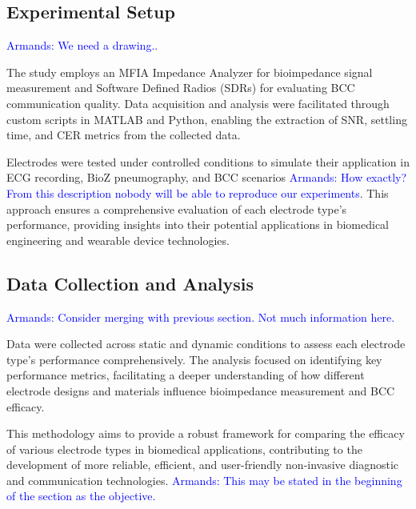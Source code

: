 \documentclass[conference]{IEEEtran}
\newcommand{\notea}[1]{\textcolor{blue}{Armands: #1}}
\begin{document}
\subsection{Experimental Setup}
\notea{We need a drawing..}

The study employs an MFIA Impedance Analyzer for bioimpedance signal measurement and Software Defined Radios (SDRs) for evaluating BCC communication quality. Data acquisition and analysis were facilitated through custom scripts in MATLAB and Python, enabling the extraction of SNR, settling time, and CER metrics from the collected data.

Electrodes were tested under controlled conditions to simulate their application in ECG recording, BioZ pneumography, and BCC scenarios \notea{How exactly? From this description nobody will be able to reproduce our experiments}. This approach ensures a comprehensive evaluation of each electrode type's performance, providing insights into their potential applications in biomedical engineering and wearable device technologies.

\subsection{Data Collection and Analysis}
\notea{Consider merging with previous section. Not much information here.}

Data were collected across static and dynamic conditions to assess each electrode type's performance comprehensively. The analysis focused on identifying key performance metrics, facilitating a deeper understanding of how different electrode designs and materials influence bioimpedance measurement and BCC efficacy.

This methodology aims to provide a robust framework for comparing the efficacy of various electrode types in biomedical applications, contributing to the development of more reliable, efficient, and user-friendly non-invasive diagnostic and communication technologies. \notea{This may be stated in the beginning of the section as the objective.}
\end{document}
